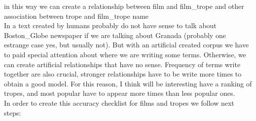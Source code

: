 \documentclass[letterpaper]{article}
\begin{document}
	in this way we can create a relationship between film and film\_trope and other association between
	trope and film\_trope name \\
	
	In a text created by humans probably do not have sense to talk about Boston\_Globe newspaper if we are talking about Granada (probably one estrange case yes, but usually not). But with an artificial created corpus we have to paid special attention about where we are writing some terms. Otherwise, we can create artificial relationships that have no sense. Frequency of terms write together are also crucial, stronger relationships have to be write more times to obtain a good model. For this reason, I think will be interesting have a ranking of tropes, and most popular have to appear more times than less popular ones. \\
	
	
	In order to create this accuracy checklist for films and tropes we follow next steps:\\
	
\end{document}
